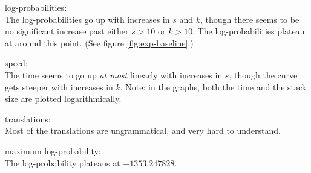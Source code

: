 \documentclass[answers]{exam}
\begin{document}
\begin{questions}
\begin{framed}
\begin{compactenum}[a.]
\item log-probabilities:\\
  The log-probabilities go up with increases in $s$ and $k$, though there seems
  to be no significant increase past either $s > 10$ or $k > 10$. The
  log-probabilities plateau at around this point. (See figure \ref{fig:exp-baseline}.)
\item speed:\\
  The time seems to go up \emph{at most} linearly with increases in $s$, though
  the curve gets steeper with increases in $k$. Note: in the graphs, both the
  time and the stack size are plotted logarithmically.
\item translations:\\
  Most of the translations are ungrammatical, and very hard to understand.
\item maximum log-probability:\\
  The log-probability plateaus at $-1353.247828$.
\end{compactenum}
\end{framed}



\end{questions}
\end{document}
